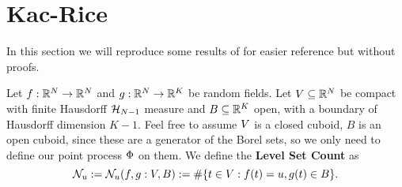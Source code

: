 \section{Kac-Rice}

In this section we will reproduce some results of
\textcite{adlerRandomFieldsGeometry2007} for easier reference but without
proofs.

Let \(f:\mathbb{R}^N\to\mathbb{R}^N\) and \(g:\mathbb{R}^N\to\mathbb{R}^K\)
be random fields. Let \(V\subseteq \mathbb{R}^N\) be compact with finite Hausdorff \(\mathcal{H}_{N-1}\)
measure and \(B\subseteq \mathbb{R}^K\) open, with a boundary of Hausdorff dimension 
\(K-1\).
Feel free to assume \(V\) is a closed cuboid, \(B\) is an open cuboid, since
these are a generator of the Borel sets, so we only need to define our point
process \(\Phi\) on them.
We define the \textbf{Level Set Count} as
\[
	\mathcal{N}_{u}:= \mathcal{N}_{u}(f, g: V, B) := \#\{t\in V : f(t) = u, g(t)\in B\}.
\]
